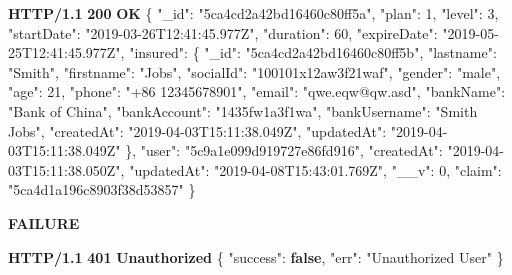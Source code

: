 \documentclass[
]{article}
\newenvironment{Shaded}{}{}
\newcommand{\DataTypeTok}[1]{\textcolor[rgb]{0.56,0.13,0.00}{#1}}
\newcommand{\DecValTok}[1]{\textcolor[rgb]{0.25,0.63,0.44}{#1}}
\newcommand{\ErrorTok}[1]{\textcolor[rgb]{1.00,0.00,0.00}{\textbf{#1}}}
\newcommand{\FunctionTok}[1]{\textcolor[rgb]{0.02,0.16,0.49}{#1}}
\newcommand{\KeywordTok}[1]{\textcolor[rgb]{0.00,0.44,0.13}{\textbf{#1}}}
\newcommand{\StringTok}[1]{\textcolor[rgb]{0.25,0.44,0.63}{#1}}
\begin{document}
\begin{Shaded}
\begin{Highlighting}[]
\ErrorTok{HTTP/1.1} \ErrorTok{200} \ErrorTok{OK}
\FunctionTok{\{}
    \DataTypeTok{"_id"}\FunctionTok{:} \StringTok{"5ca4cd2a42bd16460c80ff5a"}\FunctionTok{,}
    \DataTypeTok{"plan"}\FunctionTok{:} \DecValTok{1}\FunctionTok{,}
    \DataTypeTok{"level"}\FunctionTok{:} \DecValTok{3}\FunctionTok{,}
    \DataTypeTok{"startDate"}\FunctionTok{:} \StringTok{"2019-03-26T12:41:45.977Z"}\FunctionTok{,}
    \DataTypeTok{"duration"}\FunctionTok{:} \DecValTok{60}\FunctionTok{,}
    \DataTypeTok{"expireDate"}\FunctionTok{:} \StringTok{"2019-05-25T12:41:45.977Z"}\FunctionTok{,}
    \DataTypeTok{"insured"}\FunctionTok{:} \FunctionTok{\{}
        \DataTypeTok{"_id"}\FunctionTok{:} \StringTok{"5ca4cd2a42bd16460c80ff5b"}\FunctionTok{,}
        \DataTypeTok{"lastname"}\FunctionTok{:} \StringTok{"Smith"}\FunctionTok{,}
        \DataTypeTok{"firstname"}\FunctionTok{:} \StringTok{"Jobs"}\FunctionTok{,}
        \DataTypeTok{"socialId"}\FunctionTok{:} \StringTok{"100101x12aw3f21waf"}\FunctionTok{,}
        \DataTypeTok{"gender"}\FunctionTok{:} \StringTok{"male"}\FunctionTok{,}
        \DataTypeTok{"age"}\FunctionTok{:} \DecValTok{21}\FunctionTok{,}
        \DataTypeTok{"phone"}\FunctionTok{:} \StringTok{"+86 12345678901"}\FunctionTok{,}
        \DataTypeTok{"email"}\FunctionTok{:} \StringTok{"qwe.eqw@qw.asd"}\FunctionTok{,}
        \DataTypeTok{"bankName"}\FunctionTok{:} \StringTok{"Bank of China"}\FunctionTok{,}
        \DataTypeTok{"bankAccount"}\FunctionTok{:} \StringTok{"1435fw1a3f1wa"}\FunctionTok{,}
        \DataTypeTok{"bankUsername"}\FunctionTok{:} \StringTok{"Smith Jobs"}\FunctionTok{,}
        \DataTypeTok{"createdAt"}\FunctionTok{:} \StringTok{"2019-04-03T15:11:38.049Z"}\FunctionTok{,}
        \DataTypeTok{"updatedAt"}\FunctionTok{:} \StringTok{"2019-04-03T15:11:38.049Z"}
    \FunctionTok{\},}
    \DataTypeTok{"user"}\FunctionTok{:} \StringTok{"5c9a1e099d919727e86fd916"}\FunctionTok{,}
    \DataTypeTok{"createdAt"}\FunctionTok{:} \StringTok{"2019-04-03T15:11:38.050Z"}\FunctionTok{,}
    \DataTypeTok{"updatedAt"}\FunctionTok{:} \StringTok{"2019-04-08T15:43:01.769Z"}\FunctionTok{,}
    \DataTypeTok{"__v"}\FunctionTok{:} \DecValTok{0}\FunctionTok{,}
    \DataTypeTok{"claim"}\FunctionTok{:} \StringTok{"5ca4d1a196c8903f38d53857"}
\FunctionTok{\}}
\end{Highlighting}
\end{Shaded}

\textbf{FAILURE}

\begin{Shaded}
\begin{Highlighting}[]
\ErrorTok{HTTP/1.1} \ErrorTok{401} \ErrorTok{Unauthorized}
\FunctionTok{\{}
    \DataTypeTok{"success"}\FunctionTok{:} \KeywordTok{false}\FunctionTok{,}
    \DataTypeTok{"err"}\FunctionTok{:} \StringTok{"Unauthorized User"}
\FunctionTok{\}}
\end{Highlighting}
\end{Shaded}
\end{document}
